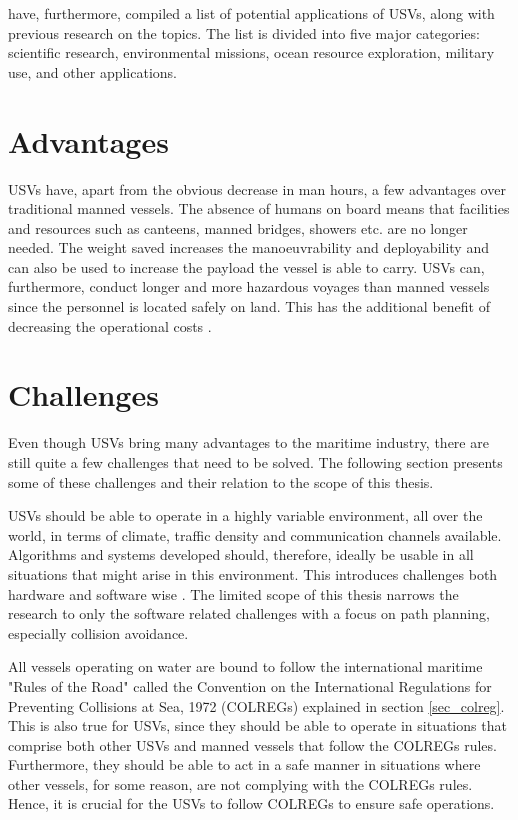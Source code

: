 \textcite{liu2016unmanned} have, furthermore, compiled a list of potential applications of USVs, along with previous research on the topics.
The list is divided into five major categories: scientific research, environmental missions, ocean resource exploration, military use, and other applications.

\section{Advantages}
USVs have, apart from the obvious decrease in man hours, a few advantages over traditional manned vessels. The absence of humans on board means that facilities and resources such as canteens,  manned bridges, showers etc. are no longer needed. The weight saved increases the manoeuvrability and deployability and can also be used to increase the payload the vessel is able to carry. USVs can, furthermore, conduct longer and more hazardous voyages than manned vessels since the personnel is located safely on land. This has the additional benefit of decreasing the operational costs \cite{liu2016unmanned}.

\section{Challenges}
Even though USVs bring many advantages to the maritime industry, there are still quite a few challenges that need to be solved. The following section presents some of these challenges and their relation to the scope of this thesis.


USVs should be able to operate in a highly variable environment, all over the world, in terms of climate, traffic density and communication channels available.  Algorithms and systems developed should, therefore, ideally be usable in all situations that might arise in this environment. This introduces challenges both hardware and software wise \cite{liu2016unmanned}. The limited scope of this thesis narrows the research to only the software related challenges with a focus on path planning, especially collision avoidance.

All vessels operating on water are bound to follow the international maritime "Rules of the Road" called the Convention on the International Regulations for Preventing Collisions at Sea, 1972 (COLREGs) explained in section \ref{sec_colreg}. This is also true for USVs, since they should be able to operate in situations that comprise both other USVs and manned vessels that follow the COLREGs rules. Furthermore, they should be able to  act in a safe manner in situations where other vessels, for some reason, are not complying with the COLREGs rules. Hence, it is crucial for the USVs to follow COLREGs to ensure safe operations.

